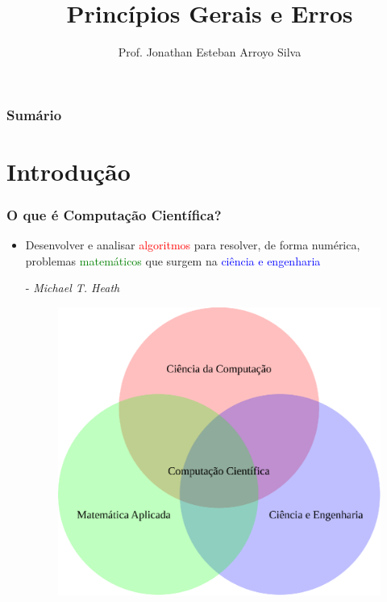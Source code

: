 \documentclass{beamer}
\title{Princípios Gerais e Erros}
\author
{
	Prof. Jonathan Esteban Arroyo Silva	
}
\institute
{
	Departamento de Ciência da Computação\\
	Universidade Federal de São João del-Rei\\
	\texttt{silva.jea@ufsj.edu.br}
}
\date{}
\begin{document}
	
\begin{frame}[plain]
    \maketitle
\end{frame}

\begin{frame}[plain]
	\frametitle{Sumário}
	\tableofcontents
\end{frame}

\section{Introdução}

\begin{frame}
	\frametitle{O que é Computação Científica?}
	\begin{itemize}
		\item Desenvolver e analisar \textcolor{red}{algoritmos} para resolver, de forma numérica, problemas \textcolor{green}{matemáticos} que surgem na \textcolor{blue}{ciência e engenharia}
		\begin{flushright}
			- \textit{Michael T. Heath}
		\end{flushright}
		\begin{figure}
			\centering
			\includegraphics[width=0.6\linewidth]{Figuras/Computacao_cientifica}
			\label{fig:computacaocientifica}
		\end{figure}
	\end{itemize}			
\end{frame}
\end{document}
